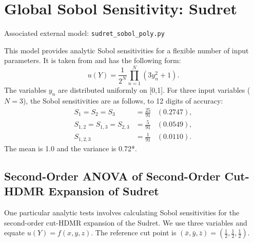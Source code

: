 \section{Global Sobol Sensitivity: Sudret}
Associated external model: \texttt{sudret\_sobol\_poly.py}

This model provides analytic Sobol sensitivities for a flexible number of input parameters.  It is taken from
\cite{sudret2007} and has the following form:
\begin{equation}
  u(Y) = \frac{1}{2^N} \prod_{n=1}^N \left(3y_n^2 + 1\right).
\end{equation}
The variables $y_n$ are distributed uniformly on [0,1].  For three input variables ($N=3$), the Sobol sensitivities are
as follows, to 12 digits of accuracy:
\begin{align}
  S_1 = S_2 = S_3 &= \frac{25}{91}\hspace{10pt} (0.2747), \\
  S_{1,2} = S_{1,3} = S_{2,3} &= \frac{5}{91}\hspace{10pt} (0.0549), \\
  S_{1,2,3} &= \frac{1}{91}\hspace{10pt} (0.0110).
\end{align}
The mean is 1.0 and the variance is 0.72*.

\subsection{Second-Order ANOVA of Second-Order Cut-HDMR Expansion of Sudret}
One particular analytic tests involves calculating Sobol sensitivities for the second-order cut-HDMR expansion
of the Sudret.  We use three variables and equate $u(Y) = f(x,y,z)$.  The reference cut point is $(\bar
x,\bar y, \bar z) = (\frac{1}{2},\frac{1}{2},\frac{1}{2})$.

